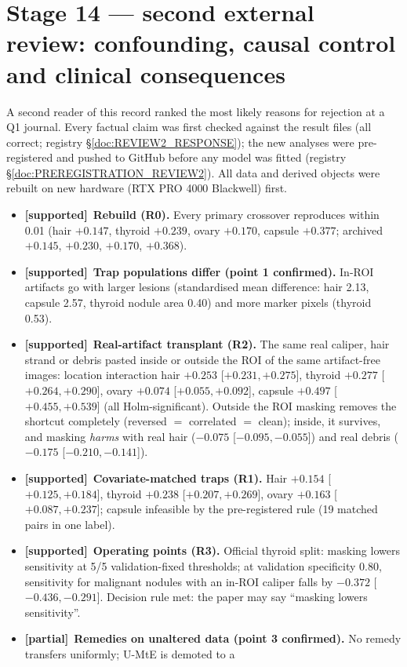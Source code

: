 \documentclass[10pt,a4paper]{article}
\newcommand{\ok}{\textcolor{green!50!black}{\textbf{[supported]}}}
\newcommand{\mixed}{\textcolor{orange!80!black}{\textbf{[partial]}}}
\begin{document}
\section{Stage 14 --- second external review: confounding, causal control and clinical consequences}\label{sec:review2}
A second reader of this record ranked the most likely reasons for rejection at a Q1 journal. Every factual claim was
first checked against the result files (all correct; registry \S\ref{doc:REVIEW2_RESPONSE}); the new analyses were
pre-registered and pushed to GitHub before any model was fitted (registry \S\ref{doc:PREREGISTRATION_REVIEW2}). All data
and derived objects were rebuilt on new hardware (RTX PRO 4000 Blackwell) first.
\begin{itemize}[leftmargin=*]\itemsep1pt
\item \ok\ \textbf{Rebuild (R0).} Every primary crossover reproduces within 0.01 (hair $+0.147$, thyroid $+0.239$, ovary
$+0.170$, capsule $+0.377$; archived $+0.145$, $+0.230$, $+0.170$, $+0.368$).
\item \ok\ \textbf{Trap populations differ (point 1 confirmed).} In-ROI artifacts go with larger lesions (standardised mean
difference: hair 2.13, capsule 2.57, thyroid nodule area 0.40) and more marker pixels (thyroid 0.53).
\item \ok\ \textbf{Real-artifact transplant (R2).} The same real caliper, hair strand or debris pasted inside or outside the
ROI of the same artifact-free images: location interaction hair $+0.253$ [$+0.231,+0.275$], thyroid $+0.277$
[$+0.264,+0.290$], ovary $+0.074$ [$+0.055,+0.092$], capsule $+0.497$ [$+0.455,+0.539$] (all Holm-significant). Outside the
ROI masking removes the shortcut completely (reversed $=$ correlated $=$ clean); inside, it survives, and masking
\emph{harms} with real hair ($-0.075$ [$-0.095,-0.055$]) and real debris ($-0.175$ [$-0.210,-0.141$]).
\item \ok\ \textbf{Covariate-matched traps (R1).} Hair $+0.154$ [$+0.125,+0.184$], thyroid $+0.238$ [$+0.207,+0.269$],
ovary $+0.163$ [$+0.087,+0.237$]; capsule infeasible by the pre-registered rule (19 matched pairs in one label).
\item \ok\ \textbf{Operating points (R3).} Official thyroid split: masking lowers sensitivity at 5/5 validation-fixed
thresholds; at validation specificity 0.80, sensitivity for malignant nodules with an in-ROI caliper falls by $-0.372$
[$-0.436,-0.291$]. Decision rule met: the paper may say ``masking lowers sensitivity''.
\item \mixed\ \textbf{Remedies on unaltered data (point 3 confirmed).} No remedy transfers uniformly; U-MtE is demoted to a

\end{itemize}
\end{document}

